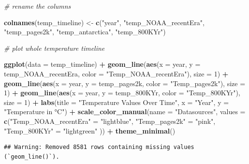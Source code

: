 \documentclass[
]{article}
\newenvironment{Shaded}{\begin{snugshade}}{\end{snugshade}}
\newcommand{\AttributeTok}[1]{\textcolor[rgb]{0.13,0.29,0.53}{#1}}
\newcommand{\CommentTok}[1]{\textcolor[rgb]{0.56,0.35,0.01}{\textit{#1}}}
\newcommand{\DecValTok}[1]{\textcolor[rgb]{0.00,0.00,0.81}{#1}}
\newcommand{\FunctionTok}[1]{\textcolor[rgb]{0.13,0.29,0.53}{\textbf{#1}}}
\newcommand{\NormalTok}[1]{#1}
\newcommand{\OtherTok}[1]{\textcolor[rgb]{0.56,0.35,0.01}{#1}}
\newcommand{\SpecialCharTok}[1]{\textcolor[rgb]{0.81,0.36,0.00}{\textbf{#1}}}
\newcommand{\StringTok}[1]{\textcolor[rgb]{0.31,0.60,0.02}{#1}}
\begin{document}
\begin{Shaded}
\begin{Highlighting}[]
\CommentTok{\# rename the columns}

\FunctionTok{colnames}\NormalTok{(temp\_timeline) }\OtherTok{\textless{}{-}} \FunctionTok{c}\NormalTok{(}\StringTok{"year"}\NormalTok{, }\StringTok{"temp\_NOAA\_recentEra"}\NormalTok{, }\StringTok{"temp\_pages2k"}\NormalTok{, }\StringTok{"temp\_antarctica"}\NormalTok{, }\StringTok{"temp\_800KYr"}\NormalTok{)}

\CommentTok{\# plot whole temperature timeline}

\FunctionTok{ggplot}\NormalTok{(}\AttributeTok{data =}\NormalTok{ temp\_timeline) }\SpecialCharTok{+}
  \FunctionTok{geom\_line}\NormalTok{(}\FunctionTok{aes}\NormalTok{(}\AttributeTok{x =}\NormalTok{ year, }\AttributeTok{y =}\NormalTok{ temp\_NOAA\_recentEra, }\AttributeTok{color =} \StringTok{"Temp\_NOAA\_recentEra"}\NormalTok{), }\AttributeTok{size =} \DecValTok{1}\NormalTok{) }\SpecialCharTok{+}
  \FunctionTok{geom\_line}\NormalTok{(}\FunctionTok{aes}\NormalTok{(}\AttributeTok{x =}\NormalTok{ year, }\AttributeTok{y =}\NormalTok{ temp\_pages2k, }\AttributeTok{color =} \StringTok{"Temp\_pages2k"}\NormalTok{), }\AttributeTok{size =} \DecValTok{1}\NormalTok{) }\SpecialCharTok{+}
  \FunctionTok{geom\_line}\NormalTok{(}\FunctionTok{aes}\NormalTok{(}\AttributeTok{x =}\NormalTok{ year, }\AttributeTok{y =}\NormalTok{ temp\_800KYr, }\AttributeTok{color =} \StringTok{"Temp\_800KYr"}\NormalTok{), }\AttributeTok{size =} \DecValTok{1}\NormalTok{) }\SpecialCharTok{+}
  \FunctionTok{labs}\NormalTok{(}\AttributeTok{title =} \StringTok{"Temperature Values Over Time"}\NormalTok{,}
       \AttributeTok{x =} \StringTok{"Year"}\NormalTok{,}
       \AttributeTok{y =} \StringTok{"Temperature in °C"}\NormalTok{) }\SpecialCharTok{+}
  \FunctionTok{scale\_color\_manual}\NormalTok{(}\AttributeTok{name =} \StringTok{"Datasources"}\NormalTok{, }\AttributeTok{values =} \FunctionTok{c}\NormalTok{(}\StringTok{"Temp\_NOAA\_recentEra"} \OtherTok{=} \StringTok{"lightblue"}\NormalTok{, }\StringTok{"Temp\_pages2k"} \OtherTok{=} \StringTok{"pink"}\NormalTok{, }\StringTok{"Temp\_800KYr"} \OtherTok{=} \StringTok{"lightgreen"}\NormalTok{ )) }\SpecialCharTok{+}
  \FunctionTok{theme\_minimal}\NormalTok{()}
\end{Highlighting}
\end{Shaded}

\begin{verbatim}
## Warning: Removed 8581 rows containing missing values (`geom_line()`).
\end{verbatim}
\end{document}
